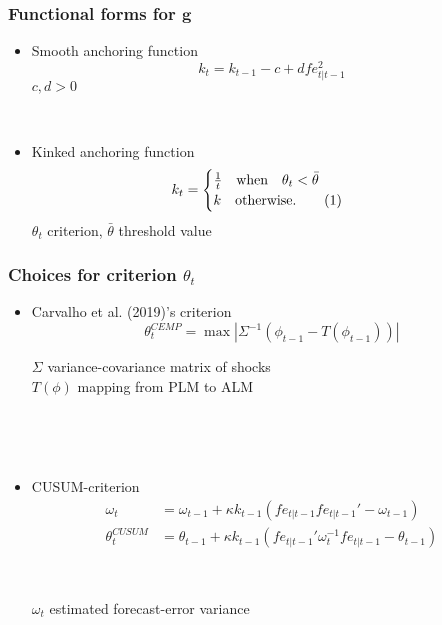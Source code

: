 \documentclass[11pt]{beamer}
\newcommand\numberthis{\addtocounter{equation}{1}\tag{\theequation}} %
\begin{document}
\begin{frame}
	\frametitle{Functional forms for $\mathbf{g}$}
	\label{g}
\begin{itemize}
\item Smooth anchoring function
\begin{equation}
k_t = k_{t-1} - c + d fe_{t|t-1}^2
\end{equation}
$c,d > 0$

\

\item Kinked anchoring function
 \begin{align*}
k_t & = \begin{cases} \frac{1}{t} \quad \text{when} \quad \theta_t < \bar{\theta}  \\ k \quad \text{otherwise.}\numberthis
\end{cases} 
\end{align*}
$\theta_t$ criterion, $\bar{\theta}$ threshold value

\end{itemize}

\vfill 
\hyperlink{anchoring1}{}	

\end{frame}

\begin{frame}
	\frametitle{Choices for criterion $\theta_t$}
	\label{g}
\begin{itemize}
\item Carvalho et al. (2019)'s criterion  
\begin{equation}
\theta_t^{CEMP} = \max | \Sigma^{-1} ( \phi_{t-1} - T(\phi_{t-1})) |
\end{equation}


$\Sigma$ variance-covariance matrix of shocks \\
$T(\phi)$ mapping from PLM to ALM

\

\

\item CUSUM-criterion
\begin{align}
\omega_t & =  \omega_{t-1} + \kappa k_{t-1}(fe_{t|t-1} fe_{t|t-1}'  -\omega_{t-1})\\
\theta_t^{CUSUM} & =  \theta_{t-1} + \kappa k_{t-1}(fe_{t|t-1}'\omega_t^{-1}fe_{t|t-1} -\theta_{t-1})
\end{align}

\

$\omega_t$ estimated forecast-error variance
\end{itemize}




\vfill

\hyperlink{anchoring1}{}	


\end{frame}
\end{document}
